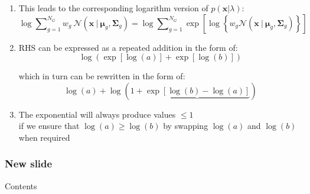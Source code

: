 \documentclass[usenames,dvipsnames]{beamer}
\def\Vec#1{{\boldsymbol{#1}}}
\def\Mat#1{{\boldsymbol{#1}}}
\begin{document}
\begin{frame}
\begin{enumerate}[{~~$\boldsymbol{\bullet}$}]
\item
This leads to the corresponding logarithm version of $p(\Vec{x} | \lambda)$:
%
\begin{equation*}
\log \sum\nolimits_{g=1}^{N_G} w_g ~ {{\mathcal{N}}}( \Vec{x} ~|~ \Vec{\mu}_g, \Mat{\Sigma}_g )
=
\log \sum\nolimits_{g=1}^{N_G} \exp\left[ \log \left\{ w_g {{\mathcal{N}}}( \Vec{x} ~|~ \Vec{\mu}_g, \Mat{\Sigma}_g ) \right\} \right]
\end{equation*}

\item
RHS can be expressed as a repeated addition in the form of:
\begin{equation*}
\log\left( \exp\left[\log(a)\right] + \exp\left[\log(b)\right] \right)
\end{equation*}

which in turn can be rewritten in the form of:
\begin{equation*}
\log(a) + \log\left( 1 + \underbrace{\exp\left[ \log(b) - \log(a) \right]} \right)
\end{equation*}

\item
The exponential will always produce values $\leq 1$\\
if we ensure that {$\log(a) \geq \log(b)$} by swapping $\log(a)$ and $\log(b)$ when required




\end{enumerate}
\end{frame}








\begin{frame}
\frametitle{New slide}
Contents
\end{frame}





%  
%  
%  
\end{document}
